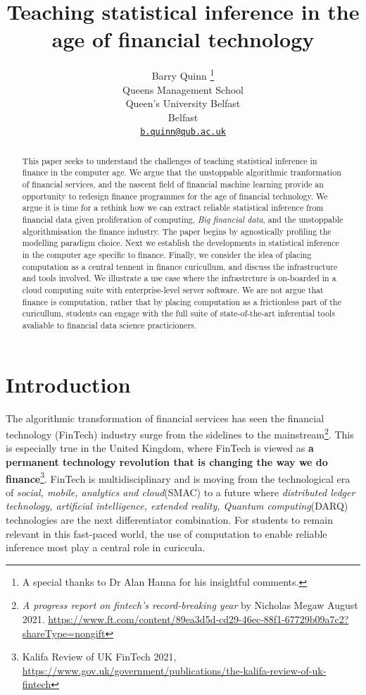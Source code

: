 \documentclass{article}
\title{Teaching statistical inference in the age of financial technology}
\author{
    Barry Quinn
    \thanks{A special thanks to Dr Alan Hanna for his insightful comments.}
   \\
    Queens Management School \\
    Queen's University Belfast \\
  Belfast \\
  \texttt{\href{mailto:b.quinn@qub.ac.uk}{\nolinkurl{b.quinn@qub.ac.uk}}} \\
  }
\begin{document}
\maketitle

\def\tightlist{}


\begin{abstract}
This paper seeks to understand the challenges of teaching statistical
inference in finance in the computer age. We argue that the unstoppable
algorithmic tranformation of financial services, and the nascent field
of financial machine learning provide an opportunity to redesign finance
programmes for the age of financial technology. We argue it is time for
a rethink how we can extract reliable statistical inference from
financial data given proliferation of computing, \emph{Big financial
data}, and the unstoppable algorithmisation the finance industry. The
paper begins by agnostically profiling the modelling paradigm choice.
Next we establish the developments in statistical inference in the
computer age specific to finance. Finally, we consider the idea of
placing computation as a central tennent in finance curicullum, and
discuss the infrastructure and tools involved. We illustrate a use case
where the infrastrcture is on-boarded in a cloud computing suite with
enterprise-level server software. We are not argue that finance is
computation, rather that by placing computation as a frictionless part
of the curicullum, students can engage with the full suite of
state-of-the-art inferential tools avaliable to financial data science
practicioners.
\end{abstract}


\hypertarget{introduction}{%
\section{Introduction}\label{introduction}}

The algorithmic transformation of financial services has seen the
financial technology (FinTech) industry surge from the sidelines to the
mainstream\footnote{\emph{A progress report on fintech's record-breaking
  year} by Nicholas Megaw August 2021.
  \url{https://www.ft.com/content/89ea3d5d-cd29-46ec-88f1-67729b09a7c2?shareType=nongift}}.
This is especially true in the United Kingdom, where FinTech is viewed
as \textbf{a permanent technology revolution that is changing the way we
do finance}\footnote{Kalifa Review of UK FinTech 2021,
  \url{https://www.gov.uk/government/publications/the-kalifa-review-of-uk-fintech}}.
FinTech is multidisciplinary and is moving from the technological era of
\emph{social, mobile, analytics and cloud}(SMAC) to a future where
\emph{distributed ledger technology, artificial intelligence, extended
reality, Quantum computing}(DARQ) technologies are the next
differentiator combination. For students to remain relevant in this
fast-paced world, the use of computation to enable reliable inference
most play a central role in curiccula.
\end{document}

